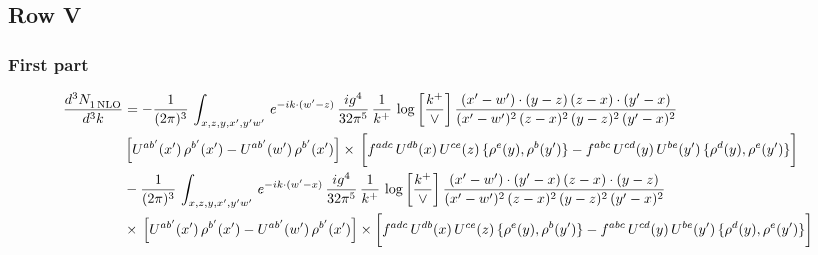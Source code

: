 \documentclass[9pt]{article}
\numberwithin{equation}{section}
\begin{document}
\subsection{Row V}
\subsubsection*{First part}
\begin{align}
     \frac{d^{3}N_{1\,\rm NLO}^{\rm}}{d^{3}k}  & = -\frac{1}{(2\pi)^{3}}\, \int_{x,z,y,x',y'w'}\,e^{-ik\cdot (w^\prime-z)}\,\frac{ig^{4}}{32\pi^{5}}\, \frac{1}{k^{+}}\,\log{\left[\frac{k^{+}}{\vee}\right]}\,\frac{(x'-w')\cdot (y-z)\,(z-x)\cdot (y'-x)}{(x'-w')^{2}\,(z-x)^{2}\,(y-z)^{2}\,(y'-x)^{2}}\,\notag \\ & \left[U^{ab'}(x')\,\rho^{b'}(x')-U^{ab'}(w')\,\rho^{b'}(x')\right]\times\, \bigg[f^{adc}\,U^{db}(x)\,U^{ce}(z)\, \{\rho^{e}(y),\rho^{b}(y')\}-f^{abc}\,U^{cd}(y)\,U^{be}(y')\, \{\rho^{d}(y),\rho^{e}(y')\}\bigg]\notag \\ &  -\frac{1}{(2\pi)^{3}}\, \int_{x,z,y,x',y'w'}\,e^{-ik\cdot (w^\prime-x)}\,\frac{ig^{4}}{32\pi^{5}}\, \frac{1}{k^{+}}\, \log{\left[\frac{k^{+}}{\vee}\right]}\,\frac{(x'-w')\cdot (y'-x)\,(z-x)\cdot (y-z)}{(x'-w')^{2}\,(z-x)^{2}\,(y-z)^{2}\,(y'-x)^{2}}\notag \\ & \times\, \left[U^{ab'}(x')\,\rho^{b'}(x')-U^{ab'}(w')\,\rho^{b'}(x')\right]\times \bigg[f^{adc}\,U^{db}(x)\,U^{ce}(z)\, \{\rho^{e}(y),\rho^{b}(y')\}-f^{abc}\,U^{cd}(y)\,U^{be}(y')\, \{\rho^{d}(y),\rho^{e}(y')\}\bigg]
\end{align}
\end{document}
